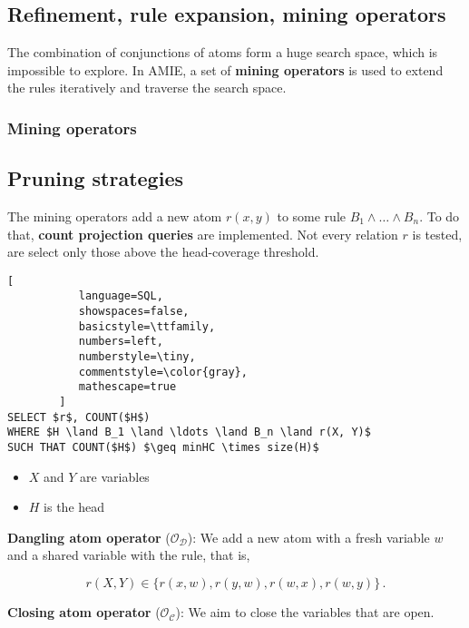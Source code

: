 \documentclass{article}
\begin{document}
\subsection{Refinement, rule expansion, mining operators}

The combination of conjunctions of atoms form a huge search space, which is
impossible to explore. In AMIE, a set of \textbf{mining operators} is used to
extend the rules iteratively and traverse the search space.

\subsubsection{Mining operators}
\subsection{Pruning strategies}

The mining operators add a new atom $r(x, y)$ to some rule $B_1 \land \ldots
\land B_n$. To do that, \textbf{count projection queries} are implemented. Not
every relation $r$ is tested, are select only those above the head-coverage threshold.


\begin{lstlisting}[
           language=SQL,
           showspaces=false,
           basicstyle=\ttfamily,
           numbers=left,
           numberstyle=\tiny,
           commentstyle=\color{gray},
           mathescape=true
        ]
SELECT $r$, COUNT($H$)
WHERE $H \land B_1 \land \ldots \land B_n \land r(X, Y)$
SUCH THAT COUNT($H$) $\geq minHC \times size(H)$
\end{lstlisting}

\begin{itemize}
    \item $X$ and $Y$ are variables
    \item $H$ is the head
\end{itemize}

\noindent \textbf{Dangling atom operator} ($\mathcal{O}_\mathcal{D}$): We add a new atom with a
fresh variable $w$ and a shared variable with the rule, that is,

\begin{equation}
    r(X, Y) \in \{ r(x, w), r(y, w), r(w, x), r(w, y) \}\,.
\end{equation}

\noindent \textbf{Closing atom operator} ($\mathcal{O}_\mathcal{C}$): We aim to close the variables
that are open.
\end{document}
